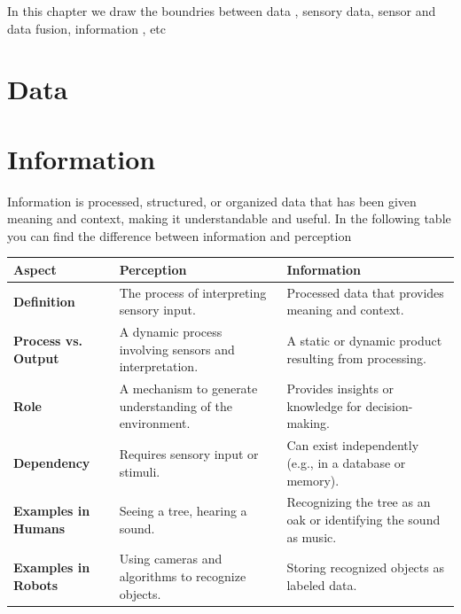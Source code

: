 \documentclass[a4paper]{article}
\title{}
\date{}
\begin{document}
    \maketitle
        In this chapter we draw the boundries between data , sensory data, sensor and data fusion, information , etc
        
        
        \section{Data}
        
        
        \section{Information} Information is processed, structured, or organized data that has been given meaning and context, making it understandable and useful. In the following table you can find the difference between information and perception
            \begin{tabular}{|l|l|l|}
                \hline
                \textbf{Aspect}             & \textbf{Perception}                                       & \textbf{Information}                                              \\ \hline
                \textbf{Definition}         & The process of interpreting sensory input.                & Processed data that provides meaning and context.                 \\ \hline
                \textbf{Process vs. Output} & A dynamic process involving sensors and interpretation. & A static or dynamic product resulting from processing. \\ \hline
                \textbf{Role}               & A mechanism to generate understanding of the environment. & Provides insights or knowledge for decision-making.               \\ \hline
                \textbf{Dependency}         & Requires sensory input or stimuli.                        & Can exist independently (e.g., in a database or memory).          \\ \hline
                \textbf{Examples in Humans} & Seeing a tree, hearing a sound.                           & Recognizing the tree as an oak or identifying the sound as music. \\ \hline
                \textbf{Examples in Robots} & Using cameras and algorithms to recognize objects.        & Storing recognized objects as labeled data.                       \\ \hline
            \end{tabular}
        
\end{document}
